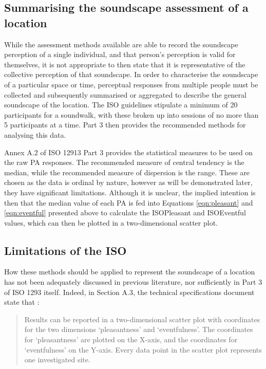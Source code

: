 \subsection{Summarising the soundscape assessment of a location}
While the assessment methods available are able to record the soundscape perception of a single individual, and that person's perception is valid for themselves, it is not appropriate to then state that it is representative of the collective perception of that soundscape. In order to characterise the soundscape of a particular space or time, perceptual responses from multiple people must be collected and subsequently summarised or aggregated to describe the general soundscape of the location. The ISO guidelines stipulate a minimum of 20 participants for a soundwalk, with these broken up into sessions of no more than 5 participants at a time. Part 3 then provides the recommended methods for analysing this data.

Annex A.2 of ISO 12913 Part 3 provides the statistical measures to be used on the raw PA responses. The recommended measure of central tendency is the median, while the recommended measure of dispersion is the range. These are chosen as the data is ordinal by nature, however as will be demonstrated later, they have significant limitations. Although it is unclear, the implied intention is then that the median value of each PA is fed into Equations \ref{eqn:pleasant} and \ref{eqn:eventful} presented above to calculate the ISOPleasant and ISOEventful values, which can then be plotted in a two-dimensional scatter plot.

\subsection{Limitations of the ISO}
How these methods should be applied to represent the soundscape of a location has not been adequately discussed in previous literature, nor sufficiently in Part 3 of ISO 1293 itself. Indeed, in Section A.3, the technical specifications document state that \citep[p. 5]{ISO12913Part3}:

\begin{quote}
  Results can be reported in a two-dimensional scatter plot with coordinates for the two dimensions ‘pleasantness’ and ‘eventfulness’. The coordinates for ‘pleasantness’ are plotted on the X-axis, and the coordinates for ‘eventfulness’ on the Y-axis. Every data point in the scatter plot represents one investigated site.
\end{quote}

